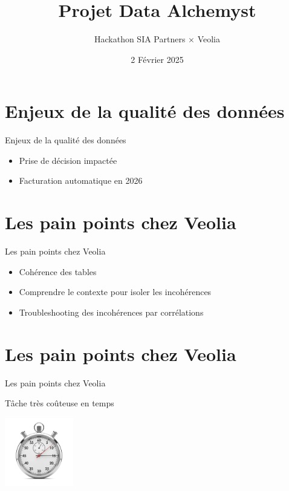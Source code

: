 \documentclass{beamer}
\title{Projet Data Alchemyst}
\subtitle{Hackathon SIA Partners $\times$ Veolia}
\date{2 Février 2025}
\begin{document}
\begin{frame}
	\titlepage
\end{frame}

\section{Enjeux de la qualité des données}
\begin{frame}{Enjeux de la qualité des données}
	\vspace*{-1cm}
	\begin{itemize}
		\item Prise de décision impactée
		\item Facturation automatique en 2026
	\end{itemize}
\end{frame}


\section{Les pain points chez Veolia}
\begin{frame}{Les pain points chez Veolia}
	\vspace*{-1cm}
	\begin{itemize}
		\item Cohérence des tables
		\item Comprendre le contexte pour isoler les incohérences
		\item Troubleshooting des incohérences par corrélations
	\end{itemize}
\end{frame}


\section{Les pain points chez Veolia}
\begin{frame}{Les pain points chez Veolia}
	\begin{center}
	Tâche très coûteuse en temps

	\includegraphics[height=3cm]{chrono.png}
	\end{center}
\end{frame}
\end{document}
